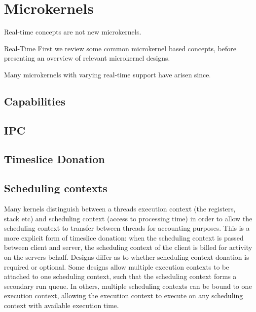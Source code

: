 
\section{Microkernels}

Real-time concepts are not new microkernels.

Real-Time
First we review some common microkernel based concepts, before presenting an overview of relevant microkernel designs.


Many microkernels with varying real-time support have arisen since.
\subsection{Capabilities}
\citet{Dennis_VanHorn_66} 

\subsection{IPC}

\subsection{Timeslice Donation}




\subsection{Scheduling contexts}

Many kernels distinguish between a threads execution context (the registers, stack etc) and scheduling context (access to processing time) in order to allow the scheduling context to transfer between threads for accounting purposes.
This is a more explicit form of timeslice donation: when the scheduling context is passed between client and server, the scheduling context of the client is billed for activity on the servers behalf. 
Designs differ as to whether scheduling context donation is required or optional. 
Some designs allow multiple execution contexts to be attached to one scheduling context, such that the scheduling context forms a secondary run queue. 
In others, multiple scheduling contexts can be bound to one execution context, allowing the execution context to execute on any scheduling context with available execution time. 


